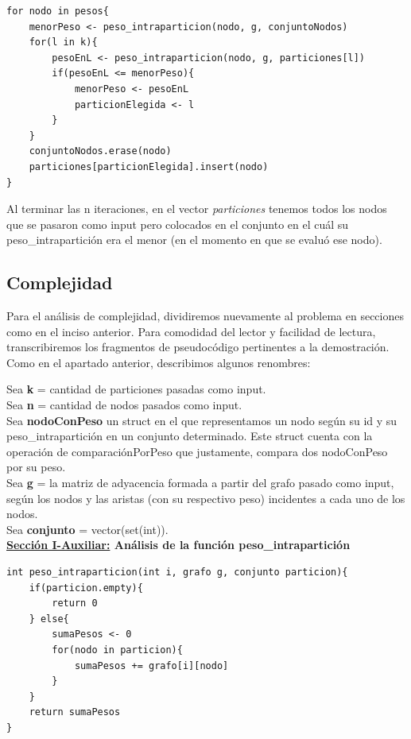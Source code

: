 \begin{lstlisting}[mathescape]
for nodo in pesos{
	menorPeso <- peso_intraparticion(nodo, g, conjuntoNodos)
	for(l in k){
		pesoEnL <- peso_intraparticion(nodo, g, particiones[l])
		if(pesoEnL <= menorPeso){
			menorPeso <- pesoEnL
			particionElegida <- l
		}
	}
	conjuntoNodos.erase(nodo)
	particiones[particionElegida].insert(nodo)
}
\end{lstlisting}


Al terminar las n iteraciones, en el vector \textit{particiones} tenemos todos los nodos que se pasaron como input pero colocados en el conjunto en el cuál su peso\_intrapartición era el menor (en el momento en que se evaluó ese nodo).


\newpage
\subsection{Complejidad}

Para el análisis de complejidad, dividiremos nuevamente al problema en secciones como en el inciso anterior. Para comodidad del lector y facilidad de lectura, transcribiremos los fragmentos de pseudocódigo pertinentes a la demostración.
Como en el apartado anterior, describimos algunos renombres:

\noindent Sea \textbf{k} = cantidad de particiones pasadas como input.\\
Sea \textbf{n} = cantidad de nodos pasados como input.\\
Sea \textbf{nodoConPeso} un struct en el que representamos un nodo según su id y su peso\_intrapartición en un conjunto determinado. Este struct cuenta con la operación de comparaciónPorPeso que justamente, compara dos nodoConPeso por su peso.\\
Sea \textbf{g} = la matriz de adyacencia formada a partir del grafo pasado como input, según los nodos y las aristas (con su respectivo peso) incidentes a cada uno de los nodos.\\
Sea \textbf{conjunto} = vector(set(int)).\\


\textbf{\underline{Sección I-Auxiliar:} Análisis de la función peso\_intrapartición}

\begin{lstlisting}
int peso_intraparticion(int i, grafo g, conjunto particion){
	if(particion.empty){
		return 0
	} else{
		sumaPesos <- 0
		for(nodo in particion){
			sumaPesos += grafo[i][nodo]
		}
	}
	return sumaPesos
}
\end{lstlisting}

